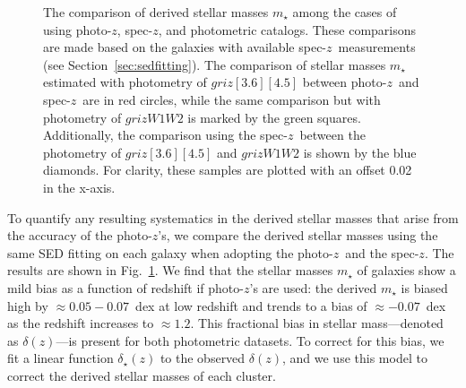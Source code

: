 \documentclass[useAMS,usenatbib,iop,numberedappendix]{mn2e}
\newcommand{\redshift}{\ensuremath{z}}
\newcommand{\IRACone}{\ensuremath{[3.6]}}
\newcommand{\IRACtwo}{\ensuremath{[4.5]}}
\newcommand{\Wone}{\ensuremath{W1}}
\newcommand{\Wtwo}{\ensuremath{W2}}
\begin{document}
%
\begin{figure}
\vskip-0.05in
\centering
{}
\vskip-0.15in
\caption{
The comparison of derived stellar masses $m_{\star}$ among the cases of using photo-\redshift, spec-\redshift, and photometric catalogs.
These comparisons are made based on the galaxies with available spec-\redshift\ measurements (see Section~\ref{sec:sedfitting}).
The comparison of stellar masses $m_{\star}$ estimated with photometry of $griz\IRACone\IRACtwo$ between photo-\redshift\ and spec-\redshift\ are in red circles, while the same comparison but with photometry of $griz\Wone\Wtwo$ is marked by the green squares.
Additionally, the comparison using the spec-\redshift\ between the photometry of $griz\IRACone\IRACtwo$ and $griz\Wone\Wtwo$ is shown by the blue diamonds.
For clarity, these samples are plotted with an offset 0.02 in the x-axis.
}
\label{fig:dm}
\end{figure}
%


To quantify any resulting systematics in the derived stellar masses that arise from the accuracy of the photo-\redshift's, we compare the derived stellar masses using the same SED fitting on each galaxy when adopting the photo-\redshift\ and the spec-\redshift.  The results are shown in Fig.~\ref{fig:dm}.
We find that the stellar masses $m_{\star}$ of galaxies show a mild bias as a function of redshift if photo-\redshift's are used:  the derived $m_{\star}$ is biased high by $\approx0.05-0.07$~dex at low redshift and trends to a bias of $\approx-0.07$~dex as the redshift increases to $\approx1.2$.  This fractional bias in stellar mass---denoted as $\delta(\redshift)$---is present for both photometric datasets.
To correct for this bias, we fit a linear function $\delta_{\star}(\redshift)$ to the observed $\delta(\redshift)$, and we use this model to correct the derived stellar masses of each cluster.
\end{document}
